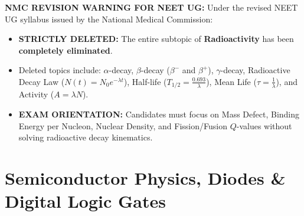 \documentclass[10pt,twoside,openright]{book}
\begin{document}
\begin{trapbox}
\textbf{NMC REVISION WARNING FOR NEET UG:}
Under the revised NEET UG syllabus issued by the National Medical Commission:
\begin{itemize}
  \item \textbf{STRICTLY DELETED:} The entire subtopic of \textbf{Radioactivity} has been \textbf{completely eliminated}.
  \item Deleted topics include: $\alpha$-decay, $\beta$-decay ($\beta^-$ and $\beta^+$), $\gamma$-decay, Radioactive Decay Law ($N(t) = N_0 e^{-\lambda t}$), Half-life ($T_{1/2} = \frac{0.693}{\lambda}$), Mean Life ($\tau = \frac{1}{\lambda}$), and Activity ($A = \lambda N$).
  \item \textbf{EXAM ORIENTATION:} Candidates must focus on Mass Defect, Binding Energy per Nucleon, Nuclear Density, and Fission/Fusion $Q$-values without solving radioactive decay kinematics.
\end{itemize}
\end{trapbox}

\section{Semiconductor Physics, Diodes \& Digital Logic Gates}
\end{document}
